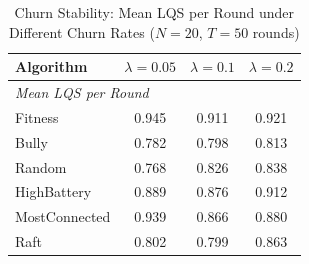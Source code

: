 \begin{table}[htbp]
\centering
\caption{Churn Stability: Mean LQS per Round under Different Churn Rates ($N=20$, $T=50$ rounds)}
\label{tab:churn}
\begin{tabular}{lccc}
\toprule
  Algorithm & $\lambda=0.05$ & $\lambda=0.1$ & $\lambda=0.2$ \\
\midrule
\multicolumn{4}{l}{\textit{Mean LQS per Round}} \\
\midrule
  Fitness & 0.945 & 0.911 & 0.921 \\
  Bully & 0.782 & 0.798 & 0.813 \\
  Random & 0.768 & 0.826 & 0.838 \\
  HighBattery & 0.889 & 0.876 & 0.912 \\
  MostConnected & 0.939 & 0.866 & 0.880 \\
  Raft & 0.802 & 0.799 & 0.863 \\
\bottomrule
\end{tabular}
\end{table}
